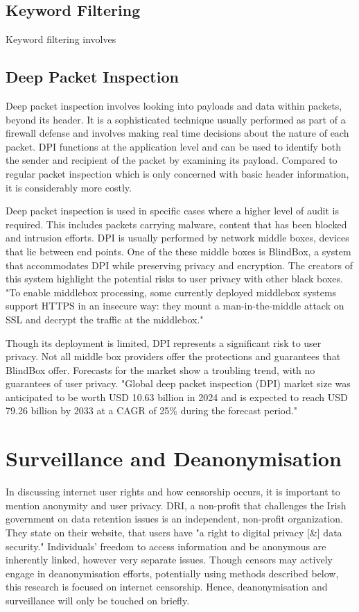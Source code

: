\subsection{Keyword Filtering}
Keyword filtering involves 

\subsection{Deep Packet Inspection}
Deep packet inspection involves looking into payloads and data within packets, beyond its header. It is a sophisticated technique usually performed as part of a firewall defense and involves making real time decisions about the nature of each packet. DPI functions at the application level and can be used to identify both the sender and recipient of the packet by examining its payload. Compared to regular packet inspection which is only concerned with basic header information, it is considerably more costly. 

Deep packet inspection is used in specific cases where a higher level of audit is required. This includes packets carrying malware, content that has been blocked and intrusion efforts. DPI is usually performed by network middle boxes, devices that lie between end points. One of the these middle boxes is BlindBox, a system that accommodates DPI while preserving privacy and encryption. The creators of this system highlight the potential risks to user privacy with other black boxes. "To enable middlebox processing, some currently deployed middlebox systems support HTTPS in
an insecure way: they mount a man-in-the-middle attack on SSL and decrypt the traffic at the middlebox." \cite{sherry2015blindbox}

Though its deployment is limited, DPI represents a significant risk to user privacy. Not all middle box providers offer the protections and guarantees that BlindBox offer. Forecasts for the market show a troubling trend, with no guarantees of user privacy. "Global deep packet inspection (DPI) market size was anticipated to be worth USD 10.63 billion in 2024 and is expected to reach USD 79.26 billion by 2033 at a CAGR of 25\% during the forecast period." \cite{DPIMarketInfo}




\section{Surveillance and Deanonymisation}

In discussing internet user rights and how censorship occurs, it is important to mention anonymity and user privacy. DRI, a non-profit that challenges the Irish government on data retention issues is an independent, non-profit organization. They state on their website, that users have "a right to digital privacy [\&] data security." \cite{digital_rights_ireland} Individuals' freedom to access information and be anonymous are inherently linked, however very separate issues. Though censors may actively engage in deanonymisation efforts, potentially using methods described below, this research is focused on internet censorship. Hence, deanonymisation and surveillance will only be touched on briefly.

